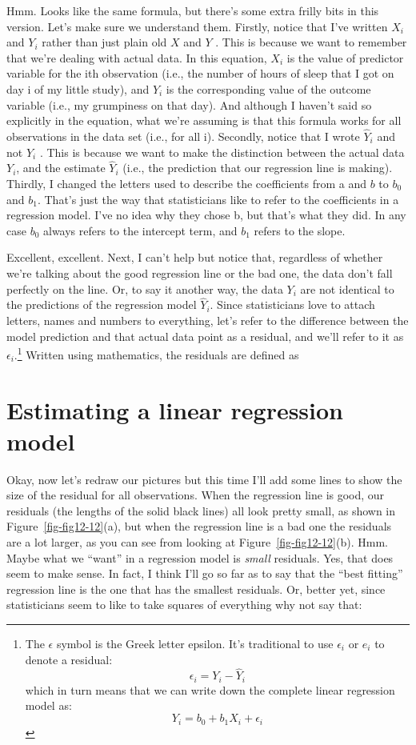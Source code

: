 \documentclass[
  a4paper,
]{book}
\begin{document}
Hmm. Looks like the same formula, but there's some extra frilly bits in
this version. Let's make sure we understand them. Firstly, notice that
I've written \(X_i\) and \(Y_i\) rather than just plain old \(X\) and
\(Y\) . This is because we want to remember that we're dealing with
actual data. In this equation, \(X_i\) is the value of predictor
variable for the ith observation (i.e., the number of hours of sleep
that I got on day i of my little study), and \(Y_i\) is the
corresponding value of the outcome variable (i.e., my grumpiness on that
day). And although I haven't said so explicitly in the equation, what
we're assuming is that this formula works for all observations in the
data set (i.e., for all i). Secondly, notice that I wrote \(\hat{Y}_i\)
and not \(Y_i\) . This is because we want to make the distinction
between the actual data \(Y_i\), and the estimate \(\hat{Y}_i\) (i.e.,
the prediction that our regression line is making). Thirdly, I changed
the letters used to describe the coefficients from a and \(b\) to
\(b_0\) and \(b_1\). That's just the way that statisticians like to
refer to the coefficients in a regression model. I've no idea why they
chose b, but that's what they did. In any case \(b_0\) always refers to
the intercept term, and \(b_1\) refers to the slope.

Excellent, excellent. Next, I can't help but notice that, regardless of
whether we're talking about the good regression line or the bad one, the
data don't fall perfectly on the line. Or, to say it another way, the
data \(Y_i\) are not identical to the predictions of the regression
model \(\hat{Y}_i\). Since statisticians love to attach letters, names
and numbers to everything, let's refer to the difference between the
model prediction and that actual data point as a residual, and we'll
refer to it as \(\epsilon_i\).\footnote{The \(\epsilon\) symbol is the
  Greek letter epsilon. It's traditional to use \(\epsilon_i\) or
  \(e_i\) to denote a residual: \[\epsilon_i=Y_i-\hat{Y}_i\] which in
  turn means that we can write down the complete linear regression model
  as: \[Y_i=b_0+b_1X_i+\epsilon_i\]} Written using mathematics, the
residuals are defined as

\hypertarget{estimating-a-linear-regression-model}{%
\section{Estimating a linear regression
model}\label{estimating-a-linear-regression-model}}

Okay, now let's redraw our pictures but this time I'll add some lines to
show the size of the residual for all observations. When the regression
line is good, our residuals (the lengths of the solid black lines) all
look pretty small, as shown in Figure~\ref{fig-fig12-12}(a), but when
the regression line is a bad one the residuals are a lot larger, as you
can see from looking at Figure~\ref{fig-fig12-12}(b). Hmm. Maybe what we
``want'' in a regression model is \emph{small} residuals. Yes, that does
seem to make sense. In fact, I think I'll go so far as to say that the
``best fitting'' regression line is the one that has the smallest
residuals. Or, better yet, since statisticians seem to like to take
squares of everything why not say that:
\end{document}
